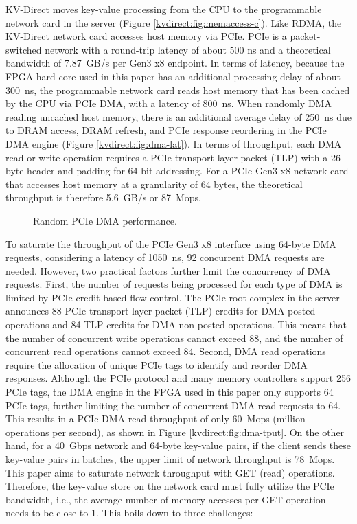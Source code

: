 {{KV-Direct moves key-value processing from the CPU to the programmable network card in the server (Figure \ref {kvdirect:fig:memaccess-c}). Like RDMA, the KV-Direct network card accesses host memory via PCIe. PCIe is a packet-switched network with a round-trip latency of about 500 ns and a theoretical bandwidth of 7.87~GB/s per Gen3 x8 endpoint. In terms of latency, because the FPGA hard core used in this paper has an additional processing delay of about 300~ns, the programmable network card reads host memory that has been cached by the CPU via PCIe DMA, with a latency of 800~ns. When randomly DMA reading uncached host memory, there is an additional average delay of 250~ns due to DRAM access, DRAM refresh, and PCIe response reordering in the PCIe DMA engine (Figure \ref {kvdirect:fig:dma-lat}). In terms of throughput, each DMA read or write operation requires a PCIe transport layer packet (TLP) with a 26-byte header and padding for 64-bit addressing. For a PCIe Gen3 x8 network card that accesses host memory at a granularity of 64 bytes, the theoretical throughput is therefore 5.6~GB/s or 87~Mops.

\begin{figure}[t]
	\centering
	\caption{Random PCIe DMA performance.}
	\label{kvdirect:fig:dma-perf}
\end{figure}

To saturate the throughput of the PCIe Gen3 x8 interface using 64-byte DMA requests, considering a latency of 1050~ns, 92 concurrent DMA requests are needed. However, two practical factors further limit the concurrency of DMA requests. First, the number of requests being processed for each type of DMA is limited by PCIe credit-based flow control. The PCIe root complex in the server announces 88 PCIe transport layer packet (TLP) credits for DMA posted operations and 84 TLP credits for DMA non-posted operations. This means that the number of concurrent write operations cannot exceed 88, and the number of concurrent read operations cannot exceed 84. Second, DMA read operations require the allocation of unique PCIe tags to identify and reorder DMA responses. Although the PCIe protocol and many memory controllers support 256 PCIe tags, the DMA engine in the FPGA used in this paper only supports 64 PCIe tags, further limiting the number of concurrent DMA read requests to 64. This results in a PCIe DMA read throughput of only 60~Mops (million operations per second), as shown in Figure \ref{kvdirect:fig:dma-tput}. On the other hand, for a 40~Gbps network and 64-byte key-value pairs, if the client sends these key-value pairs in batches, the upper limit of network throughput is 78~Mops. This paper aims to saturate network throughput with GET (read) operations. Therefore, the key-value store on the network card must fully utilize the PCIe bandwidth, i.e., the average number of memory accesses per GET operation needs to be close to 1. This boils down to three challenges:

}}
